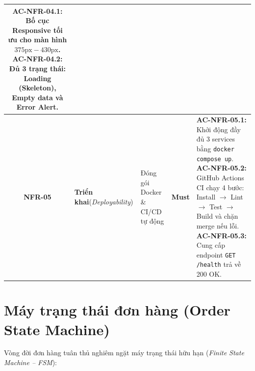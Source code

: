 \documentclass[12pt,a4paper]{article}
\begin{document}
\begin{table}[H]
\begin{tabularx}{\textwidth}{|c|>{\raggedright\arraybackslash}p{2.8cm}|>{\raggedright\arraybackslash}p{4cm}|c|>{\raggedright\arraybackslash}X|}
\textbf{AC-NFR-04.1:} Bố cục Responsive tối ưu cho màn hình $375\text{px} - 430\text{px}$.\newline
\textbf{AC-NFR-04.2:} Đủ 3 trạng thái: Loading (Skeleton), Empty data và Error Alert. \\
\hline
\textbf{NFR-05} & \textbf{Triển khai}\newline(\textit{Deployability}) & Đóng gói Docker \& CI/CD tự động & \textbf{Must} & 
\textbf{AC-NFR-05.1:} Khởi động đầy đủ 3 services bằng \texttt{docker compose up}.\newline
\textbf{AC-NFR-05.2:} GitHub Actions CI chạy 4 bước: Install $\rightarrow$ Lint $\rightarrow$ Test $\rightarrow$ Build và chặn merge nếu lỗi.\newline
\textbf{AC-NFR-05.3:} Cung cấp endpoint \texttt{GET /health} trả về 200 OK. \\
\hline
\end{tabularx}
\end{table}

\section{Máy trạng thái đơn hàng (Order State Machine)}
Vòng đời đơn hàng tuân thủ nghiêm ngặt máy trạng thái hữu hạn (\textit{Finite State Machine -- FSM}):

\begin{center}
\small
{}
\end{center}
\end{document}
